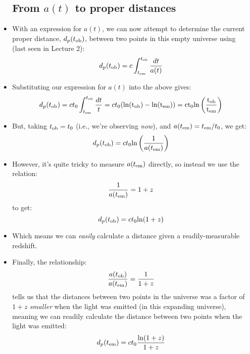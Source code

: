 \documentclass[11pt]{article}
\begin{document}
\begin{itemize}
\subsection{From $a(t)$ to proper distances}
\item With an expression for $a(t)$, we can now attempt to determine the current proper distance, $d_p(t_{\rm ob})$,  between two points in this empty universe using (last seen in Lecture 2):
\begin{equation}
d_p(t_{\rm ob}) = c\int_{t_{\rm em}}^{t_{\rm ob}} \frac{dt}{a(t)}
\end{equation}
\item Substituting our expression for $a(t)$ into the above gives:
\begin{equation}
    d_p(t_{\rm ob}) = ct_0\int_{t_{\rm em}}^{t_{\rm ob}}\frac{dt}{t} = ct_0(\rm ln(t_{\rm ob})-ln(t_{\rm em})) = ct_0ln\left(\frac{t_{\rm ob}}{t_{\rm em}}\right)
\end{equation}
\item But, taking $t_{\rm ob}=t_0$ (i.e., we're observing {\it now}), and $a(t_{\rm em})=t_{\rm em}/t_0$, we get:
\begin{equation}
    d_p(t_{\rm ob}) = ct_0{\rm ln}\left(\frac{1}{a(t_{\rm em})}\right)
\end{equation} 
\item However, it's quite tricky to measure $a(t_{\rm em})$ directly, so instead we use the relation:
\begin{equation}
    \frac{1}{a(t_{\rm em})} = 1+z
\end{equation} 
to get:
\begin{equation}
d_p(t_{\rm ob}) = ct_0{\rm ln}(1+z)
\end{equation} 
\item Which means we can {\it easily} calculate a distance given a readily-measurable redshift.
\item Finally, the relationship:
\begin{equation}
\frac{a(t_{\rm ob})}{a(t_{\rm em})} = \frac{1}{1+z}
\end{equation}    
tells us that the distances between two points in the universe was a factor of $1+z$ {\it smaller} when the light was emitted (in this expanding universe), meaning we can readily calculate the distance between two points when the light was emitted:
\begin{equation}
    d_p(t_{\rm em}) = ct_0\frac{{\rm ln}(1+z)}{1+z}
    \end{equation} 
    
\end{itemize}
\end{document}
